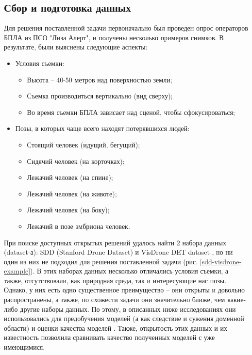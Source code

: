 \subsection{Сбор и подготовка данных}\label{sect-3}

Для решения поставленной задачи первоначально был проведен опрос операторов БПЛА из ПСО "Лиза Алерт", и получены несколько примеров снимков. В результате, были выяснены следующие аспекты:

\begin{itemize}
    \item Условия съемки:
    \begin{itemize}
        \item Высота -- 40-50 метров над поверхностью земли;
        \item Съемка производиться вертикально (вид сверху);
        \item Во время съемки БПЛА зависает над сценой, чтобы сфокусироваться;
    \end{itemize}
    \item Позы, в которых чаще всего находят потерявшихся людей:
    \begin{itemize}
        \item Стоящий человек (идущий, бегущий);
        \item Сидячий человек (на корточках);
        \item Лежачий человек (на спине);
        \item Лежачий человек (на животе);
        \item Лежачий человек (на боку);
        \item Лежачий в позе эмбриона человек.
    \end{itemize}
\end{itemize}

При поиске доступных открытых решений удалось найти 2 набора данных (dataset-а): SDD (Stanford Drone Dataset) \cite{lib-sdd} и VisDrone DET dataset \cite{lib-visdrone}, но ни один из них не подходил для решения поставленной задачи (рис. \ref{sdd-visdrone-example}). В этих наборах данных несколько отличались условия съемки, а также, отсутствовали, как природная среда, так и интересующие нас позы. Однако, у них есть одно существенное преимущество -- они открыты и довольно распространены, а также, по схожести задачи они значительно ближе, чем какие-либо другие наборы данных. По этому, в описанных ниже исследованиях они использовались для предобучения моделей (а как следствие и сужения доменной области) и оценки качества моделей \cite{lib-transfer-learning}. Также, открытость этих данных и их известность позволила сравнивать качество полученных моделей с уже имеющимися.

